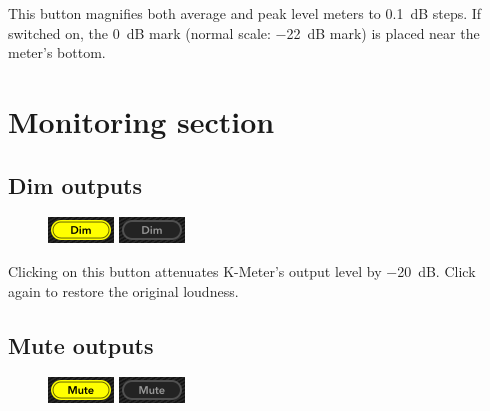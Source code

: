 This button magnifies both average and peak level meters to
\SI{0.1}{\dB} steps.  If switched on, the \SI{0}{\dB} mark (normal
scale: \SI{-22}{\dB} mark) is placed near the meter's bottom.

\newpage %

\section{Monitoring section}

\subsection{Dim outputs}

\begin{figure}
\includegraphics[scale=\screenshotscale,clip]{include/images/button_dim_on.png}
\newline \vspace{-0.9\baselineskip}
\includegraphics[scale=\screenshotscale,clip]{include/images/button_dim_off.png}
\end{figure}

Clicking on this button attenuates K-Meter's output level by
\SI{-20}{\dB}.  Click again to restore the original loudness.

\subsection{Mute outputs}

\begin{figure}
\includegraphics[scale=\screenshotscale,clip]{include/images/button_mute_on.png}
\newline \vspace{-0.9\baselineskip}
\includegraphics[scale=\screenshotscale,clip]{include/images/button_mute_off.png}
\end{figure}


